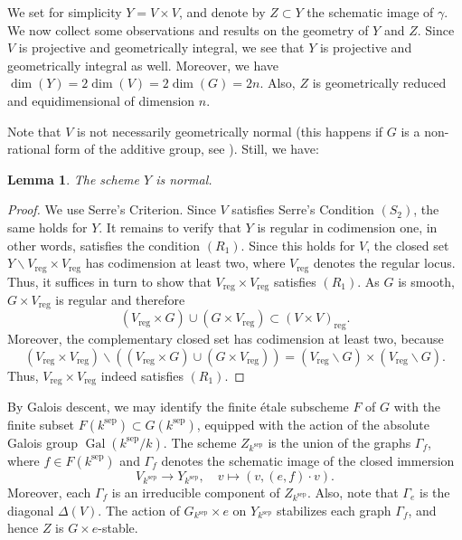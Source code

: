\documentclass[oneside, 12pt]{amsart}
\newtheorem{lemma}[theorem]{Lemma}
\theoremstyle{definition}
\theoremstyle{remark}
\newcommand{\Gal}{\operatorname{Gal}}
\newcommand{\reg}{\operatorname{reg}}
\newcommand{\sep}{{\operatorname{sep}}}
\begin{document}
We set for simplicity $Y = V \times V$, 
and denote by $Z \subset Y$ the schematic image 
of $\gamma$. 
We now collect some observations and results
on the geometry of $Y$ and $Z$. 
Since $V$ is projective and geometrically 
integral, we see that $Y$ is projective and 
geometrically integral as well. Moreover, 
we have $\dim(Y) = 2 \dim(V) = 2 \dim(G) = 2n$. 
Also, $Z$ is geometrically reduced and 
equidimensional of dimension $n$.

Note that $V$ is not necessarily geometrically
normal (this happens if $G$ is a non-rational form
of the additive group, see \cite{Russell 1970}). 
Still, we have: 

\begin{lemma}\label{lem:nor}
The scheme $Y$ is normal.
\end{lemma}

\begin{proof}
We use Serre's Criterion. Since $V$ satisfies Serre's Condition $(S_2)$, 
the same holds for $Y$. It remains to verify that $Y$ is regular in codimension one, 
in other words,  satisfies  the condition $(R_1)$. Since this holds for $V$,
the closed set $Y\smallsetminus V_{\reg} \times V_{\reg}$ has codimension at least two,
where $V_{\reg}$ denotes the regular locus. 
Thus, it suffices in turn to show that
$V_{\reg} \times V_{\reg}$ satisfies $(R_1)$.
As $G$ is smooth, $G \times V_{\reg}$ is regular and therefore
$$
(V_{\reg} \times G) \cup (G \times V_{\reg}) \subset (V \times V)_{\reg}.
$$
Moreover, the complementary closed set
has codimension at least two, because 
\[ (V_{\reg} \times V_{\reg}) \smallsetminus 
((V_{\reg} \times G) \cup (G \times V_{\reg}))
= (V_{\reg} \smallsetminus G) \times 
(V_{\reg} \smallsetminus G). \]
Thus, $V_{\reg} \times V_{\reg}$ indeed satisfies $(R_1)$.
\end{proof}


By Galois descent, we may identify the 
finite \'etale subscheme $F$ of $G$ with 
the finite subset 
$F(k^{\sep}) \subset G(k^{\sep})$,
equipped with the  action of the absolute
Galois group $\Gal(k^\sep/k)$. The scheme 
$Z_{k^{\sep}}$ is the union of the graphs 
$\Gamma_f$, where $f \in F(k^{\sep})$ and 
$\Gamma_f$ denotes the schematic image of 
the closed immersion
\[ V_{k^{\sep}} \longrightarrow Y_{k^{\sep}},
\quad v \longmapsto (v,(e,f) \cdot v).  \]
Moreover, each $\Gamma_f$ is an irreducible
component of $Z_{k^{\sep}}$. Also, note that
$\Gamma_e$ is the diagonal $\Delta(V)$. 
The action of $G_{k^{\sep}} \times e$ on 
$Y_{k^{\sep}}$ 
stabilizes each graph $\Gamma_f$, and hence
$Z$ is $G \times e$-stable. 
\end{document}
